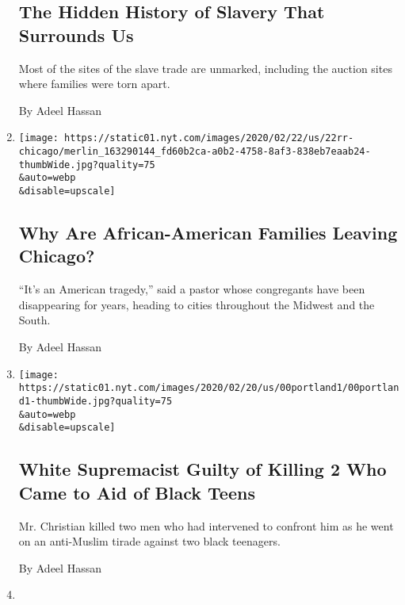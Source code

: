 \begin{enumerate}
  \hypertarget{the-hidden-history-of-slavery-that-surrounds-us}{%
  \subsection{The Hidden History of Slavery That Surrounds
  Us}\label{the-hidden-history-of-slavery-that-surrounds-us}}

  Most of the sites of the slave trade are unmarked, including the
  auction sites where families were torn apart.

  By Adeel Hassan
\item
  \href{/2020/02/22/us/why-are-african-american-families-leaving-chicago.html}{}

  \texttt{[image: https://static01.nyt.com/images/2020/02/22/us/22rr-chicago/merlin\_163290144\_fd60b2ca-a0b2-4758-8af3-838eb7eaab24-thumbWide.jpg?quality=75\\\&auto=webp\\\&disable=upscale]}

  \hypertarget{why-are-african-american-families-leaving-chicago}{%
  \subsection{Why Are African-American Families Leaving
  Chicago?}\label{why-are-african-american-families-leaving-chicago}}

  ``It's an American tragedy,'' said a pastor whose congregants have
  been disappearing for years, heading to cities throughout the Midwest
  and the South.

  By Adeel Hassan
\item
  \href{/2020/02/21/us/white-supremacist-guilty-of-killing-2-who-came-to-aid-of-black-teens.html}{}

  \texttt{[image: https://static01.nyt.com/images/2020/02/20/us/00portland1/00portland1-thumbWide.jpg?quality=75\\\&auto=webp\\\&disable=upscale]}

  \hypertarget{white-supremacist-guilty-of-killing-2-who-came-to-aid-of-black-teens}{%
  \subsection{White Supremacist Guilty of Killing 2 Who Came to Aid of
  Black
  Teens}\label{white-supremacist-guilty-of-killing-2-who-came-to-aid-of-black-teens}}

  Mr. Christian killed two men who had intervened to confront him as he
  went on an anti-Muslim tirade against two black teenagers.

  By Adeel Hassan
\item
  \href{/2020/02/15/us/how-andrew-yang-handled-his-asian-american-identity-on-the-campaign-trail.html}{}


\end{enumerate}
